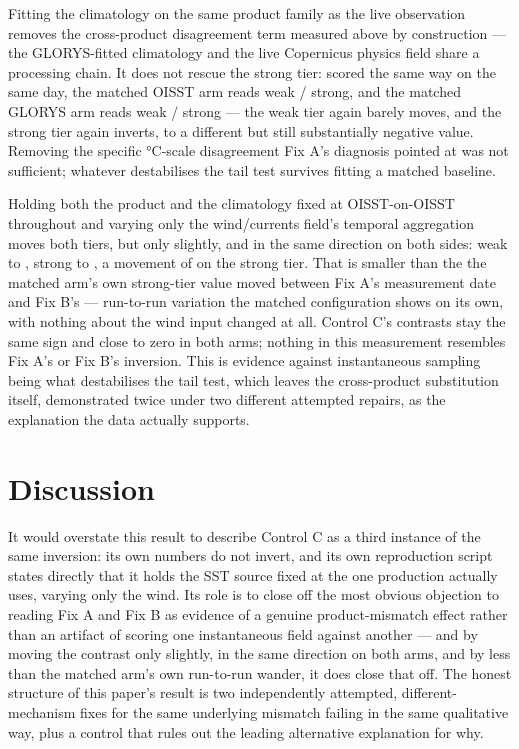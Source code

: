  Fitting the climatology on the
same product family as the live observation removes the cross-product
disagreement term measured above by construction --- the GLORYS-fitted
climatology and the live Copernicus physics field share a processing chain.
It does not rescue the strong tier: scored the same way on the same day, the
matched OISST arm reads \FixBWeakOisst{} weak / \FixBStrongOisst{} strong,
and the matched GLORYS arm reads \FixBWeakGlorys{} weak /
\FixBStrongGlorys{} strong --- the weak tier again barely moves, and the
strong tier again inverts, to a different but still substantially negative
value. Removing the specific \DisagCoastalSD{}\si{\celsius}-scale disagreement
Fix A's diagnosis pointed at was not sufficient; whatever destabilises the tail test
survives fitting a matched baseline.

 Holding
both the product and the climatology fixed at OISST-on-OISST throughout and
varying only the wind/currents field's temporal aggregation moves both
tiers, but only slightly, and in the same direction on both sides: weak
\CtrlWeakInstant{} to \CtrlWeakTrailing{}, strong \CtrlStrongInstant{} to
\CtrlStrongTrailing{}, a movement of \CtrlStrongDelta{} on the strong tier.
That is smaller than the \MatchedArmWander{} the matched arm's own strong-tier
value moved between Fix A's measurement date and Fix B's ---
run-to-run variation the matched configuration shows on its own, with nothing
about the wind input changed at all. Control C's contrasts stay the same sign
and close to zero in both arms; nothing in this measurement resembles Fix A's
or Fix B's inversion. This is evidence against instantaneous sampling being
what destabilises the tail test, which leaves the cross-product substitution
itself, demonstrated twice under two different attempted repairs, as the
explanation the data actually supports.

\section{Discussion}
\label{sec:discussion}

It would overstate this result to describe Control C as a third instance of
the same inversion: its own numbers do not invert, and its own reproduction
script states directly that it holds the SST source fixed at the one
production actually uses, varying only the wind. Its role is to close off the
most obvious objection to reading Fix A and Fix B as evidence of a genuine
product-mismatch effect rather than an artifact of scoring one instantaneous
field against another --- and by moving the contrast only slightly, in the
same direction on both arms, and by less than the matched arm's own
run-to-run wander, it does close that off. The honest structure of this
paper's result is two independently attempted, different-mechanism fixes for
the same underlying mismatch failing in the same qualitative way, plus a
control that rules out the leading alternative explanation for why.

